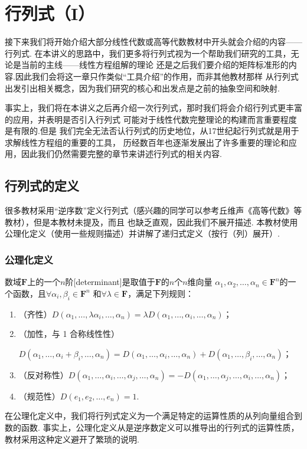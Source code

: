 \chapter{行列式（I）}

接下来我们将开始介绍大部分线性代数或高等代数教材中开头就会介绍的内容——行列式.
在本讲义的思路中，我们更多将行列式视为一个帮助我们研究的工具，无论是当前的主线——线性方程组解的理论
还是之后我们要介绍的矩阵标准形的内容.因此我们会将这一章只作类似``工具介绍''的作用，而非其他教材那样
从行列式出发引出相关概念，因为我们研究的核心和出发点是之前的抽象空间和映射.

事实上，我们将在本讲义之后再介绍一次行列式，那时我们将会介绍行列式更丰富的应用，并表明是否引入行列式
可能对于线性代数完整理论的构建而言重要程度是有限的.但是
我们完全无法否认行列式的历史地位，从17世纪起行列式就是用于求解线性方程组的重要的工具，
历经数百年也逐渐发展出了许多重要的理论和应用，因此我们仍然需要完整的章节来讲述行列式的相关内容.

\section{行列式的定义}
很多教材采用``逆序数''定义行列式（感兴趣的同学可以参考丘维声《高等代数》等教材），但是本教材未提及，而且
也缺乏直观，因此我们不展开描述. 本教材使用公理化定义（使用一些规则描述）并讲解了递归式定义（按行（列）展开）.

\subsection{公理化定义}
\begin{definition} \label{def:13:公理化定义}
    数域$\mathbf{F}$上的一个$n$阶[determinant]是取值于$\mathbf{F}$的$n$个$n$维向量
    $\alpha_1,\alpha_2,\ldots,\alpha_n \in \mathbf{F}^n$的一个函数，且$\forall \alpha_i,\beta_i \in \mathbf{F}^n$
    和$\forall \lambda \in \mathbf{F}$，满足下列规则：
    \begin{enumerate}
        \item（齐性）$D(\alpha_1,\ldots,\lambda\alpha_i,\ldots,\alpha_n)=\lambda D(\alpha_1,\ldots,\alpha_i,\ldots,\alpha_n)$；

        \item（加性，与 1 合称线性性）

        $D(\alpha_1,\ldots,\alpha_i+\beta_i,\ldots,\alpha_n)=D(\alpha_1,\ldots,\alpha_i,\ldots,\alpha_n)+D(\alpha_1,\ldots,\beta_i,\ldots,\alpha_n)$；

        \item（反对称性）$D(\alpha_1,\ldots,\alpha_i,\ldots,\alpha_j,\ldots,\alpha_n)=-D(\alpha_1,\ldots,\alpha_j,\ldots,\alpha_i,\ldots,\alpha_n)$；

        \item（规范性）$D(e_1,e_2,\ldots,e_n)=1$.
    \end{enumerate}
\end{definition}
在公理化定义中，我们将行列式定义为一个满足特定的运算性质的从列向量组合到数的函数.
事实上，公理化定义从是逆序数定义可以推导出的行列式的运算性质，教材采用这种定义避开了繁琐的说明.

